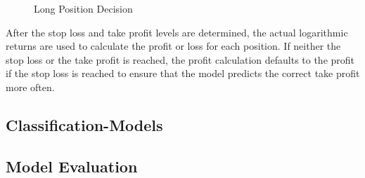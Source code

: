 \begin{figure}[H]
    \centering
    
    \caption{Long Position Decision}
    \label{fig:loss-tp-sl}
\end{figure}

After the stop loss and take profit levels are determined, the actual logarithmic returns are used to calculate the profit or loss for each position. If neither the stop loss or the take profit is reached, the profit calculation defaults to the profit if the stop loss is reached to ensure that the model predicts the correct take profit more often.

\subsection{Classification-Models}

\subsection{Model Evaluation}